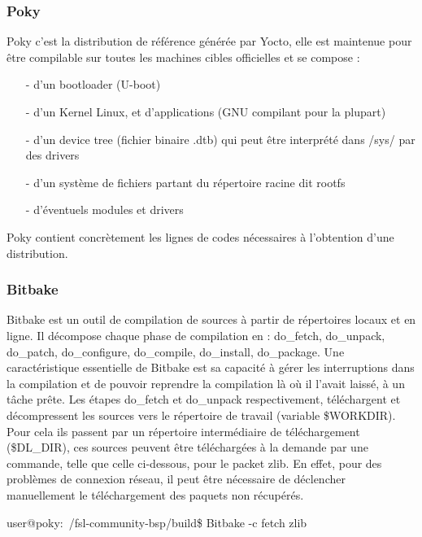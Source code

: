 \subsubsection{Poky}

Poky c'est la distribution de référence générée par Yocto, elle est maintenue pour être
compilable sur toutes les machines cibles officielles et se compose :

\begin{itemize}
    \item[-] d'un bootloader (U-boot)
    \item[-] d’un Kernel Linux, et d’applications (GNU compilant pour la plupart)
    \item[-] d’un device tree (fichier binaire .dtb) qui peut être interprété dans /sys/ par des
    drivers
    \item[-] d’un système de fichiers partant du répertoire racine dit rootfs
    \item[-] d’éventuels modules et drivers
\end{itemize}

Poky contient concrètement les lignes de codes nécessaires à l'obtention d'une distribution.

\subsubsection{Bitbake}

Bitbake est un outil de compilation de sources à partir de répertoires locaux et en ligne. Il
décompose chaque phase de compilation en : do\_fetch, do\_unpack, do\_patch,
do\_configure, do\_compile, do\_install, do\_package. Une caractéristique essentielle de
Bitbake est sa capacité à gérer les interruptions dans la compilation et de pouvoir
reprendre la compilation là où il l'avait laissé, à un tâche prête.
Les étapes do\_fetch et do\_unpack respectivement, téléchargent et décompressent les
sources vers le répertoire de travail (variable \$WORKDIR). Pour cela ils passent par un
répertoire intermédiaire de téléchargement (\$DL\_DIR), ces sources peuvent être
téléchargées à la demande par une commande, telle que celle ci-dessous, pour le packet
zlib. En effet, pour des problèmes de connexion réseau, il peut être nécessaire de
déclencher manuellement le téléchargement des paquets non récupérés.

\begin{tcolorbox}
    user@poky:~/fsl-community-bsp/build\$ Bitbake -c fetch zlib
\end{tcolorbox}


